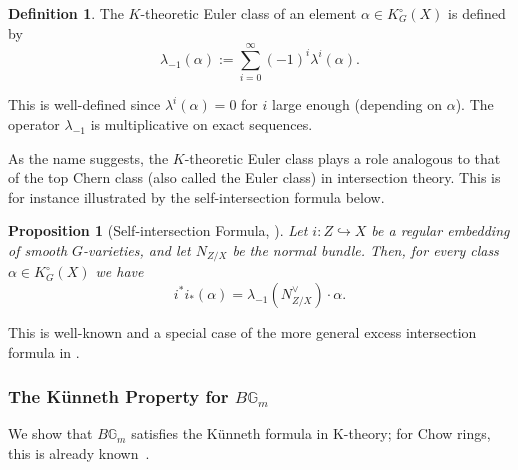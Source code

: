 \documentclass[12pt]{amsart}
\newcommand\Gm{\mathbb{G}_m}
\newcommand{\Kring}{K^{\circ}}
\newtheorem{Prop}[theorem]{Proposition}
\theoremstyle{definition}
\newtheorem{Def}[theorem]{Definition}
\begin{document}
\begin{Def}\label{def:euler_class}
    The $K$-theoretic Euler class of an element $\alpha\in\Kring_G(X)$ is defined by
\begin{equation*}
    \lambda_{-1}(\alpha):=\sum_{i=0}^{\infty}(-1)^i\lambda^i(\alpha).
\end{equation*}
\end{Def}
This is well-defined since $\lambda^i(\alpha)=0$ for $i$ large enough (depending on $\alpha$). The operator $\lambda_{-1}$ is multiplicative on exact sequences.

As the name suggests, the $K$-theoretic Euler class plays a role analogous to that of the top Chern class (also called the Euler class) in intersection theory. This is for instance illustrated by the self-intersection formula below.

\begin{Prop}[Self-intersection Formula, {\cite[Theorem 3.1]{Thomason-blowup}}]\label{prop: self intersection formula}
    Let $i:Z\hookrightarrow X$ be a regular embedding of smooth $G$-varieties, and let $N_{Z/X}$ be the normal bundle. Then, for every class $\alpha\in\Kring_G(X)$ we have
    \[
        i^*i_*(\alpha)=\lambda_{-1}(N_{Z/X}^{\vee})\cdot\alpha.
    \]
\end{Prop}

This is well-known \cite[Theorem 3.1]{Thomason-blowup} and a special case of the more general excess intersection formula in .

\subsubsection{The K\"unneth Property for $B\Gm$}

We show that $B\Gm$ satisfies the K\"unneth formula in K-theory; for Chow rings, this is already known~\cite[Lemma 10]{Oesinghaus18}.
\end{document}
